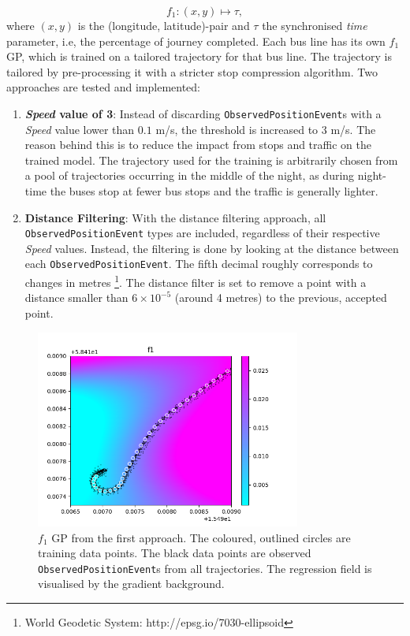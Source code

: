 \begin{equation} \label{eq:gps-var-f1}
    f_1: (x, y) \longmapsto \tau,
 \end{equation}
where $(x, y)$ is the (longitude, latitude)-pair and $\tau$ the synchronised \textit{time} parameter, i.e, the percentage of journey completed.
Each bus line has its own $f_1$ GP, which is trained on a tailored trajectory for that bus line.
The trajectory is tailored by pre-processing it with a stricter stop compression algorithm.
Two approaches are tested and implemented:
\begin{enumerate}
    \item \textbf{\textit{Speed} value of 3}:
    Instead of discarding \texttt{ObservedPositionEvent}s with a \textit{Speed} value lower than $0.1$ m/s, the threshold is increased to $3$ m/s.
    The reason behind this is to reduce the impact from stops and traffic on the trained model.
    The trajectory used for the training is arbitrarily chosen from a pool of trajectories occurring in the middle of the night, as during night-time the buses stop at fewer bus stops and the traffic is generally lighter.
    \item \textbf{Distance Filtering}:
    With the distance filtering approach, all \texttt{ObservedPositionEvent} types are included, regardless of their respective \textit{Speed} values.
    Instead, the filtering is done by looking at the distance between each \texttt{ObservedPositionEvent}.
    The fifth decimal roughly corresponds to changes in metres \footnote{World Geodetic System: http://epsg.io/7030-ellipsoid}.
    The distance filter is set to remove a point with a distance smaller than $6\times10^{-5}$ (around 4 metres) to the previous, accepted point.
\end{enumerate}

\begin{figure}[t]   
    \centering 
    \includegraphics[width=0.775\textwidth]{figures/f1_gp/f1_gp_small_all_data}
    \caption[$f_1$ GP from the first approach]%
    {{\small $f_1$ GP from the first approach.
    The coloured, outlined circles are training data points.
    The black data points are observed \texttt{ObservedPositionEvent}s from all trajectories.
    The regression field is visualised by the gradient background.}}    
    \label{fig:f1-gp-bad}
\end{figure}

